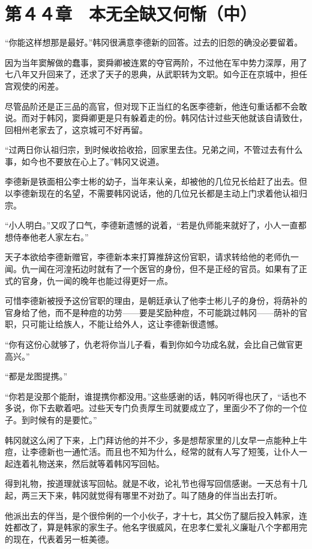\section{第４４章　本无全缺又何惭（中）}

“你能这样想那是最好。”韩冈很满意李德新的回答。过去的旧怨的确没必要留着。

因为当年窦解做的蠢事，窦舜卿被连累的夺官两阶，不过他在军中势力深厚，用了七八年又升回来了，还求了天子的恩典，从武职转为文职。如今正在京城中，担任宫观使的闲差。

尽管品阶还是正三品的高官，但对现下正当红的名医李德新，他连句重话都不会敢说。而对于韩冈，窦舜卿更是只有躲着走的份。韩冈估计过些天他就该自请致仕，回相州老家去了，这京城可不好再留。

“过两日你认祖归宗，到时候收拾收拾，回家里去住。兄弟之间，不管过去有什么事，如今也不要放在心上了。”韩冈又说道。

李德新是铁面相公李士彬的幼子，当年来认亲，却被他的几位兄长给赶了出去。但以李德新现在的名望，不需要韩冈说话，他的几位兄长都是主动上门求着他认祖归宗。

“小人明白。”又叹了口气，李德新遗憾的说着，“若是仇师能来就好了，小人一直都想侍奉他老人家左右。”

天子本欲给李德新赠官，李德新本来打算推辞这份官职，请求转给他的老师仇一闻。仇一闻在河湟拓边时就有了一个医官的身份，但不是正经的官员。如果有了正式的官身，仇一闻的晚年也能过得更好一点。

可惜李德新被授予这份官职的理由，是朝廷承认了他李士彬儿子的身份，将荫补的官身给了他，而不是种痘的功劳——要是奖励种痘，不可能跳过韩冈——荫补的官职，只可能让给族人，不能让给外人，这让李德新很遗憾。

“你有这份心就够了，仇老将你当儿子看，看到你如今功成名就，会比自己做官更高兴。”

“都是龙图提携。”

“你若是没那个能耐，谁提携你都没用。”这些感谢的话，韩冈听得也厌了，“话也不多说，你下去歇着吧。过些天专门负责厚生司就要成立了，里面少不了你的一个位子。到时候有的是要忙。”

韩冈就这么闲了下来，上门拜访他的并不少，多是想帮家里的儿女早一点能种上牛痘，让李德新也一通忙活。而且也不知为什么，经常的就有人写了短笺，让仆人一起连着礼物送来，然后就等着韩冈写回帖。

得到礼物，按道理就该写回帖。就是不收，论礼节也得写回信感谢。一天总有十几起，两三天下来，韩冈就觉得有哪里不对劲了。叫了随身的伴当出去打听。

他派出去的伴当，是个很伶俐的一个小伙子，才十七，其父伤了腿后投入韩家，连姓都改了，算是韩家的家生子。他名字很威风，在忠孝仁爱礼义廉耻八个字都用完的现在，代表着另一桩美德。

